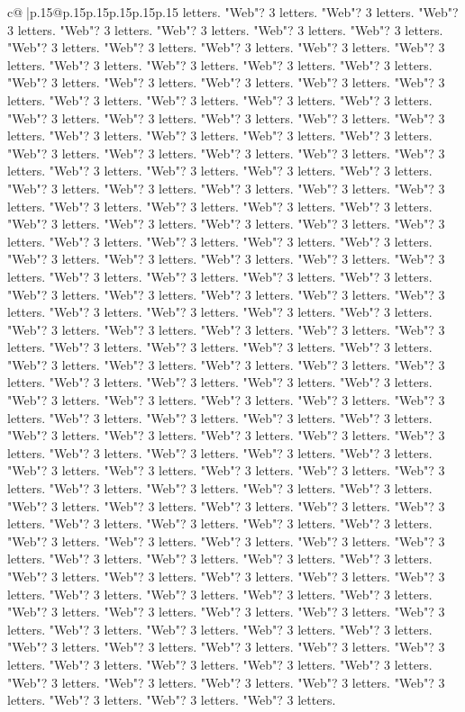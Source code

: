\documentclass{article}
\begin{document}
{\begin{supertabular}{c@{$\;$}|p{.15\linewidth}@{}p{.15\linewidth}p{.15\linewidth}p{.15\linewidth}p{.15\linewidth}p{.15\linewidth}}
{{{letters. "Web"? 3 letters. "Web"? 3 letters. "Web"? 3 letters. "Web"? 3 letters. "Web"? 3 letters. "Web"? 3 letters. "Web"? 3 letters. "Web"? 3 letters. "Web"? 3 letters. "Web"? 3 letters. "Web"? 3 letters. "Web"? 3 letters. "Web"? 3 letters. "Web"? 3 letters. "Web"? 3 letters. "Web"? 3 letters. "Web"? 3 letters. "Web"? 3 letters. "Web"? 3 letters. "Web"? 3 letters. "Web"? 3 letters. "Web"? 3 letters. "Web"? 3 letters. "Web"? 3 letters. "Web"? 3 letters. "Web"? 3 letters. "Web"? 3 letters. "Web"? 3 letters. "Web"? 3 letters. "Web"? 3 letters. "Web"? 3 letters. "Web"? 3 letters. "Web"? 3 letters. "Web"? 3 letters. "Web"? 3 letters. "Web"? 3 letters. "Web"? 3 letters. "Web"? 3 letters. "Web"? 3 letters. "Web"? 3 letters. "Web"? 3 letters. "Web"? 3 letters. "Web"? 3 letters. "Web"? 3 letters. "Web"? 3 letters. "Web"? 3 letters. "Web"? 3 letters. "Web"? 3 letters. "Web"? 3 letters. "Web"? 3 letters. "Web"? 3 letters. "Web"? 3 letters. "Web"? 3 letters. "Web"? 3 letters. "Web"? 3 letters. "Web"? 3 letters. "Web"? 3 letters. "Web"? 3 letters. "Web"? 3 letters. "Web"? 3 letters. "Web"? 3 letters. "Web"? 3 letters. "Web"? 3 letters. "Web"? 3 letters. "Web"? 3 letters. "Web"? 3 letters. "Web"? 3 letters. "Web"? 3 letters. "Web"? 3 letters. "Web"? 3 letters. "Web"? 3 letters. "Web"? 3 letters. "Web"? 3 letters. "Web"? 3 letters. "Web"? 3 letters. "Web"? 3 letters. "Web"? 3 letters. "Web"? 3 letters. "Web"? 3 letters. "Web"? 3 letters. "Web"? 3 letters. "Web"? 3 letters. "Web"? 3 letters. "Web"? 3 letters. "Web"? 3 letters. "Web"? 3 letters. "Web"? 3 letters. "Web"? 3 letters. "Web"? 3 letters. "Web"? 3 letters. "Web"? 3 letters. "Web"? 3 letters. "Web"? 3 letters. "Web"? 3 letters. "Web"? 3 letters. "Web"? 3 letters. "Web"? 3 letters. "Web"? 3 letters. "Web"? 3 letters. "Web"? 3 letters. "Web"? 3 letters. "Web"? 3 letters. "Web"? 3 letters. "Web"? 3 letters. "Web"? 3 letters. "Web"? 3 letters. "Web"? 3 letters. "Web"? 3 letters. "Web"? 3 letters. "Web"? 3 letters. "Web"? 3 letters. "Web"? 3 letters. "Web"? 3 letters. "Web"? 3 letters. "Web"? 3 letters. "Web"? 3 letters. "Web"? 3 letters. "Web"? 3 letters. "Web"? 3 letters. "Web"? 3 letters. "Web"? 3 letters. "Web"? 3 letters. "Web"? 3 letters. "Web"? 3 letters. "Web"? 3 letters. "Web"? 3 letters. "Web"? 3 letters. "Web"? 3 letters. "Web"? 3 letters. "Web"? 3 letters. "Web"? 3 letters. "Web"? 3 letters. "Web"? 3 letters. "Web"? 3 letters. "Web"? 3 letters. "Web"? 3 letters. "Web"? 3 letters. "Web"? 3 letters. "Web"? 3 letters. "Web"? 3 letters. "Web"? 3 letters. "Web"? 3 letters. "Web"? 3 letters. "Web"? 3 letters. "Web"? 3 letters. "Web"? 3 letters. "Web"? 3 letters. "Web"? 3 letters. "Web"? 3 letters. "Web"? 3 letters. "Web"? 3 letters. "Web"? 3 letters. "Web"? 3 letters. "Web"? 3 letters. "Web"? 3 letters. "Web"? 3 letters. "Web"? 3 letters. "Web"? 3 letters. "Web"? 3 letters. "Web"? 3 letters. "Web"? 3 letters. "Web"? 3 letters. "Web"? 3 letters. "Web"? 3 letters. "Web"? 3 letters. "Web"? 3 letters. "Web"? 3 letters. "Web"? 3 letters. "Web"? 3 letters. "Web"? 3 letters. "Web"? 3 letters. "Web"? 3 letters. "Web"? 3 letters. "Web"? 3 letters. "Web"? 3 letters. "Web"? 3 letters. "Web"? 3 letters. }}}
\end{supertabular}}
\end{document}
